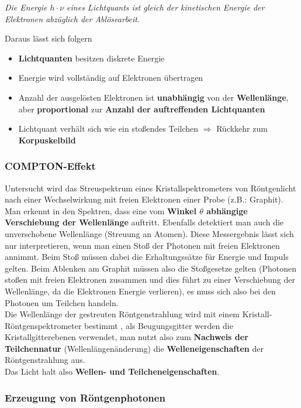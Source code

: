\documentclass[12pt,a4paper,ngerman]{article}
\begin{document}
\begin{center}
\textit{Die Energie $h \cdot \nu$ eines Lichtquants ist gleich der kinetischen Energie der Elektronen abzüglich der Ablösearbeit.}
\end{center}
Daraus lässt sich folgern
\begin{itemize}
\item \textbf{Lichtquanten} besitzen diskrete Energie
\item Energie wird vollständig auf Elektronen übertragen
\item Anzahl der ausgelösten Elektronen ist \textbf{unabhängig} von der \textbf{Wellenlänge}, aber \textbf{proportional} zur \textbf{Anzahl der auftreffenden Lichtquanten}
\item Lichtquant verhält sich wie ein stoßendes Teilchen $\Rightarrow$ Rückkehr zum \textbf{Korpuskelbild}
\end{itemize}


\pagebreak

\subsubsection{COMPTON-Effekt}
Untersucht wird das Streuspektrum eines Kristallspektrometers von Röntgenlicht nach einer Wechselwirkung mit freien Elektronen einer Probe (z.B.: Graphit). Man erkennt in den Spektren, dass eine vom \textbf{Winkel $\theta$ abhängige Verschiebung der Wellenlänge} auftritt. Ebenfalls detektiert man auch die unverschobene Wellenlänge (Streuung an Atomen). Diese Messergebnis lässt sich nur interpretieren, wenn man einen Stoß der Photonen mit freien Elektronen annimmt. Beim Stoß müssen dabei die Erhaltungssätze für Energie und Impuls gelten. Beim Ablenken am Graphit müssen also die Stoßgesetze gelten (Photonen stoßen mit freien Elektronen zusammen und dies führt zu einer Verschiebung der Wellenlänge, da die Elektronen Energie verlieren), es muss sich also bei den Photonen um Teilchen handeln. \\
Die Wellenlänge der gestreuten Röntgenstrahlung wird mit einem  Kristall-Röntgenspektrometer bestimmt , als Beugungsgitter werden die Kristallgitterebenen verwendet, man nutzt also zum \textbf{Nachweis der Teilchennatur} (Wellenlängenänderung) die \textbf{Welleneigenschaften} der Röntgenstrahlung aus. \\
Das Licht halt also \textbf{Wellen- und Teilcheneigenschaften}. 



\subsubsection{Erzeugung von Röntgenphotonen}
\end{document}
